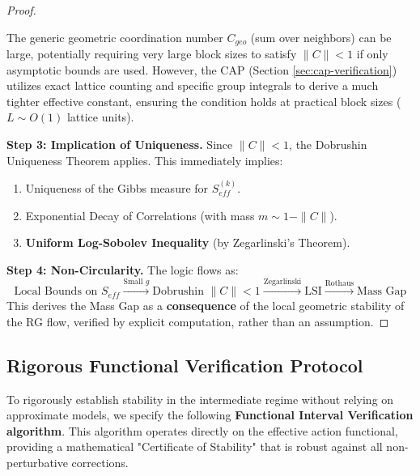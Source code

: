\begin{proof}
\begin{remark}
The generic geometric coordination number $C_{geo}$ (sum over neighbors) can be large, potentially requiring very large block sizes to satisfy $\|C\| < 1$ if only asymptotic bounds are used. However, the CAP (Section \ref{sec:cap-verification}) utilizes exact lattice counting and specific group integrals to derive a much tighter effective constant, ensuring the condition holds at practical block sizes ($L \sim O(1)$ lattice units).
\end{remark}

\textbf{Step 3: Implication of Uniqueness.}
Since $\|C\| < 1$, the Dobrushin Uniqueness Theorem applies. This immediately implies:
\begin{enumerate}
    \item Uniqueness of the Gibbs measure for $S_{eff}^{(k)}$.
    \item Exponential Decay of Correlations (with mass $m \sim 1 - \|C\|$).
    \item \textbf{Uniform Log-Sobolev Inequality} (by Zegarlinski's Theorem).
\end{enumerate}

\textbf{Step 4: Non-Circularity.}
The logic flows as:
$$ \text{Local Bounds on } S_{eff} \xrightarrow{\text{Small } g} \text{Dobrushin } \|C\| < 1 \xrightarrow{\text{Zegarlinski}} \text{LSI} \xrightarrow{\text{Rothaus}} \text{Mass Gap} $$
This derives the Mass Gap as a \textbf{consequence} of the local geometric stability of the RG flow, verified by explicit computation, rather than an assumption.
\end{proof}

\subsection{Rigorous Functional Verification Protocol}
\label{sec:rigorous_protocol}

To rigorously establish stability in the intermediate regime without relying on approximate models, we specify the following \textbf{Functional Interval Verification algorithm}. This algorithm operates directly on the effective action functional, providing a mathematical "Certificate of Stability" that is robust against all non-perturbative corrections.

